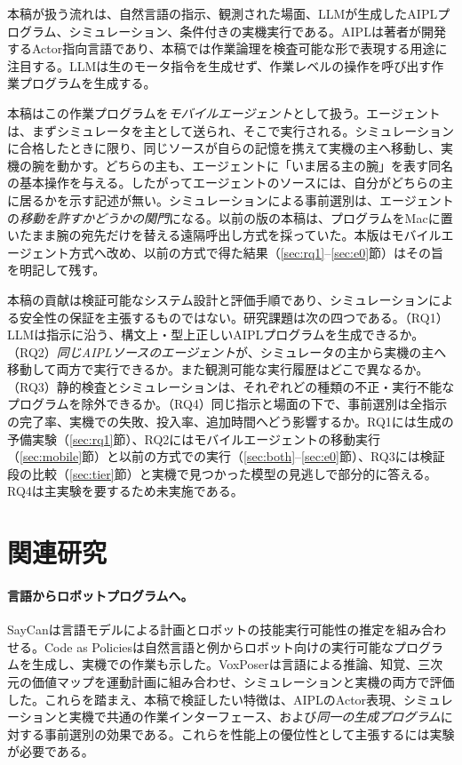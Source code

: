 \documentclass[10pt,letterpaper]{article}
\begin{document}
本稿が扱う流れは、自然言語の指示、観測された場面、LLMが生成したAIPLプログラム、シミュレーション、条件付きの実機実行である。AIPLは著者が開発するActor指向言語であり、本稿では作業論理を検査可能な形で表現する用途に注目する。LLMは生のモータ指令を生成せず、作業レベルの操作を呼び出す作業プログラムを生成する。

本稿はこの作業プログラムを\emph{モバイルエージェント}として扱う。エージェントは、まずシミュレータを主として送られ、そこで実行される。シミュレーションに合格したときに限り、同じソースが自らの記憶を携えて実機の主へ移動し、実機の腕を動かす。どちらの主も、エージェントに「いま居る主の腕」を表す同名の基本操作を与える。したがってエージェントのソースには、自分がどちらの主に居るかを示す記述が無い。シミュレーションによる事前選別は、エージェントの\emph{移動を許すかどうかの関門}になる。以前の版の本稿は、プログラムをMacに置いたまま腕の宛先だけを替える遠隔呼出し方式を採っていた。本版はモバイルエージェント方式へ改め、以前の方式で得た結果（\ref{sec:rq1}--\ref{sec:e0}節）はその旨を明記して残す。

本稿の貢献は検証可能なシステム設計と評価手順であり、シミュレーションによる安全性の保証を主張するものではない。研究課題は次の四つである。（RQ1）LLMは指示に沿う、構文上・型上正しいAIPLプログラムを生成できるか。（RQ2）\emph{同じAIPLソースのエージェント}が、シミュレータの主から実機の主へ移動して両方で実行できるか。また観測可能な実行履歴はどこで異なるか。（RQ3）静的検査とシミュレーションは、それぞれどの種類の不正・実行不能なプログラムを除外できるか。（RQ4）同じ指示と場面の下で、事前選別は全指示の完了率、実機での失敗、投入率、追加時間へどう影響するか。RQ1には生成の予備実験（\ref{sec:rq1}節）、RQ2にはモバイルエージェントの移動実行（\ref{sec:mobile}節）と以前の方式での実行（\ref{sec:both}--\ref{sec:e0}節）、RQ3には検証段の比較（\ref{sec:tier}節）と実機で見つかった模型の見逃しで部分的に答える。RQ4は主実験を要するため未実施である。

\section{関連研究}
\paragraph{言語からロボットプログラムへ。}SayCanは言語モデルによる計画とロボットの技能実行可能性の推定を組み合わせる\cite{ahn2022}。Code as Policiesは自然言語と例からロボット向けの実行可能なプログラムを生成し、実機での作業も示した\cite{liang2022}。VoxPoserは言語による推論、知覚、三次元の価値マップを運動計画に組み合わせ、シミュレーションと実機の両方で評価した\cite{huang2023}。これらを踏まえ、本稿で検証したい特徴は、AIPLのActor表現、シミュレーションと実機で共通の作業インターフェース、および\emph{同一の生成プログラム}に対する事前選別の効果である。これらを性能上の優位性として主張するには実験が必要である。
\end{document}
